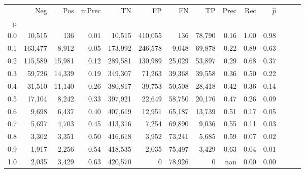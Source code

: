 \begin{tabular}{rrrrrrrrrrrrrr}
\toprule
{} &      Neg &     Pos & mPrec &       TN &       FP &      FN &      TP &  Prec &   Rec & $\hat{p}$ \\
p   &          &         &       &          &          &         &         &       &       &           \\
\midrule
0.0 &   10,515 &     136 &  0.01 &   10,515 &  410,055 &     136 &  78,790 &  0.16 &  1.00 &      0.98 \\
0.1 &  163,477 &   8,912 &  0.05 &  173,992 &  246,578 &   9,048 &  69,878 &  0.22 &  0.89 &      0.63 \\
0.2 &  115,589 &  15,981 &  0.12 &  289,581 &  130,989 &  25,029 &  53,897 &  0.29 &  0.68 &      0.37 \\
0.3 &   59,726 &  14,339 &  0.19 &  349,307 &   71,263 &  39,368 &  39,558 &  0.36 &  0.50 &      0.22 \\
0.4 &   31,510 &  11,140 &  0.26 &  380,817 &   39,753 &  50,508 &  28,418 &  0.42 &  0.36 &      0.14 \\
0.5 &   17,104 &   8,242 &  0.33 &  397,921 &   22,649 &  58,750 &  20,176 &  0.47 &  0.26 &      0.09 \\
0.6 &    9,698 &   6,437 &  0.40 &  407,619 &   12,951 &  65,187 &  13,739 &  0.51 &  0.17 &      0.05 \\
0.7 &    5,697 &   4,703 &  0.45 &  413,316 &    7,254 &  69,890 &   9,036 &  0.55 &  0.11 &      0.03 \\
0.8 &    3,302 &   3,351 &  0.50 &  416,618 &    3,952 &  73,241 &   5,685 &  0.59 &  0.07 &      0.02 \\
0.9 &    1,917 &   2,256 &  0.54 &  418,535 &    2,035 &  75,497 &   3,429 &  0.63 &  0.04 &      0.01 \\
1.0 &    2,035 &   3,429 &  0.63 &  420,570 &        0 &  78,926 &       0 &   nan &  0.00 &      0.00 \\
\bottomrule
\end{tabular}
